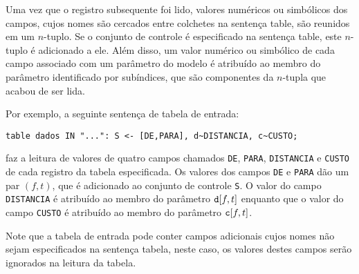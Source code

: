 \documentclass[11pt, brazil]{report}
\begin{document}
Uma vez que o registro subsequente foi lido, valores numéricos ou simbólicos
dos campos, cujos nomes são cercados entre colchetes na sentença table,
são reunidos em um $n$-tuplo. Se o conjunto de controle é especificado
na sentença table, este $n$-tuplo é adicionado a ele. Além disso, um valor
numérico ou simbólico de cada campo associado com um parâmetro do modelo
é atribuído ao membro do parâmetro identificado por subíndices, que são
componentes da $n$-tupla que acabou de ser lida.

Por exemplo, a seguinte sentença de tabela de entrada:

\noindent\hfil
\verb|table dados IN "...": S <- [DE,PARA], d~DISTANCIA, c~CUSTO;|

\noindent
faz a leitura de valores de quatro campos chamados {\tt DE}, {\tt PARA},
{\tt DISTANCIA} e {\tt CUSTO} de cada registro da tabela especificada.
Os valores dos campos {\tt DE} e {\tt PARA} dão um par $(f,t)$, que é
adicionado ao conjunto de controle {\tt S}. O valor do campo {\tt DISTANCIA} é
atribuído ao membro do parâmetro ${\tt d}[f,t]$ enquanto que o valor do campo
{\tt CUSTO} é atribuído ao membro do parâmetro ${\tt c}[f,t]$.

Note que a tabela de entrada pode conter campos adicionais cujos nomes
não sejam especificados na sentença tabela, neste caso, os valores destes
campos serão ignorados na leitura da tabela.

%
%
%
%
%
\end{document}
